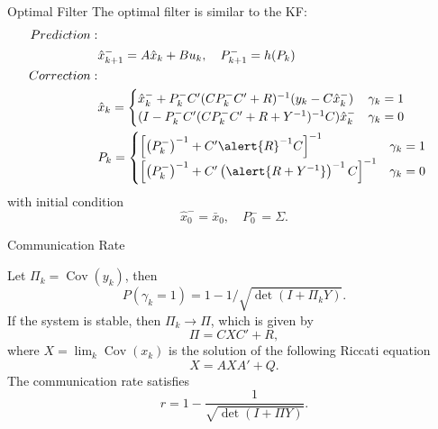 \documentclass{beamer}
\DeclareMathOperator{\Cov}{Cov}
\begin{document}
  \begin{frame}{Optimal Filter}
    The optimal filter is similar to the KF:
    \begin{align*}
      Prediction:&&\\
      &\hat x _{k + 1}^-  = A \hat x_{k} + Bu_k  , \quad P_{k + 1}^-  = h(P_k)\\
      Correction:&&\\
      &\hat x_{k} = \begin{cases}
	\hat x_{k}^-  + P_k^- C'(CP_k^- C'+R)^{-1} (y_k  - C \hat x _{k}^- ) & \gamma_ k = 1\\ 
	(I - P_k^-C'(CP_k^-C'+R+Y^{-1})^{-1}C)\hat x_{k}^-   & \gamma_ k = 0 
      \end{cases}\\
      &P_{k} =\begin{cases}
	\left[\left(P_k^-\right)^{-1} + C'\alert{R}^{-1}C\right]^{-1} & \gamma_k = 1\\
	\left[\left(P_k^-\right)^{-1} + C'\left( \alert{R+Y^{-1} }\right)^{-1}C\right]^{-1}  &\gamma_k = 0
      \end{cases}
    \end{align*}
    with initial condition
    \begin{displaymath}
      \hat x_{0}^-  = \bar x_0 ,\quad P_{0}^-  = \Sigma.
    \end{displaymath}
  \end{frame}


  \begin{frame}{Communication Rate}
    \begin{theorem}
      Let $\Pi_k = \Cov(y_k)$, then
      \begin{displaymath}
	P(\gamma_k = 1) = 1-1/\sqrt{\det(I+\Pi_kY)}.
      \end{displaymath}
      If the system is stable, then $\Pi_k\rightarrow \Pi$, which is given by
      \begin{displaymath}
	\Pi = CX C' + R,
      \end{displaymath}
      where $X = \lim_k \Cov(x_k)$ is the solution of the following Riccati equation
      \begin{displaymath}
	X = AXA' + Q. 
      \end{displaymath}
      The communication rate satisfies
      \begin{displaymath}
	r = 1-\frac{1}{\sqrt{\det(I+\Pi Y)}}.
      \end{displaymath}
    \end{theorem}
  \end{frame}
\end{document}
